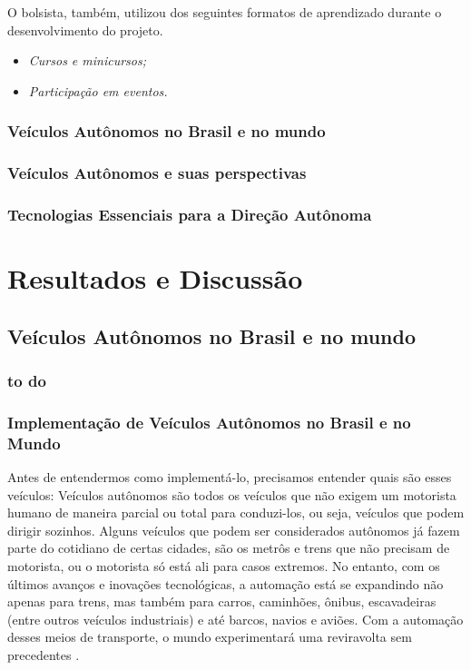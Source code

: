 O bolsista, também, utilizou dos seguintes formatos de aprendizado durante o desenvolvimento do projeto.
\begin{itemize}
\item \textit{Cursos e minicursos;}
\item \textit{Participação em eventos.}
\end{itemize}


\subsection{Veículos Autônomos no Brasil e no mundo}

\subsection{Veículos Autônomos e suas perspectivas}

\subsection{Tecnologias Essenciais para a Direção Autônoma}

\newpage

\chapter{Resultados e Discussão} \label{resultados}

\section{Veículos Autônomos no Brasil e no mundo}

\subsection{to do}


\subsection{Implementação de Veículos Autônomos no Brasil e no Mundo}

Antes de entendermos como implementá-lo, precisamos entender quais são esses veículos: Veículos autônomos são todos os veículos que não exigem um motorista humano de maneira parcial ou total para conduzi-los, ou seja, veículos que podem dirigir sozinhos. Alguns veículos que podem ser considerados autônomos já fazem parte do cotidiano de certas cidades, são os metrôs e trens que não precisam de motorista, ou o motorista só está ali para casos extremos. No entanto, com os últimos avanços e inovações tecnológicas, a automação está se expandindo não apenas para trens, mas também para carros, caminhões, ônibus, escavadeiras (entre outros veículos industriais) e até barcos, navios e aviões. Com a automação desses meios de transporte, o mundo experimentará uma reviravolta sem precedentes \cite{4cenarios_ocidental}.

